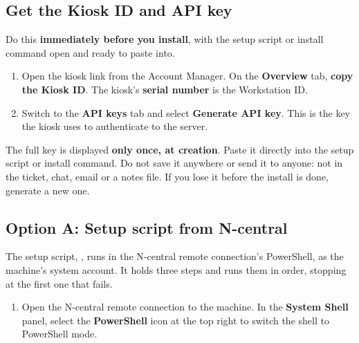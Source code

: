 \documentclass[a4paper,10pt]{article}
\begin{document}
\subsection{Get the Kiosk ID and API key}\label{sec:getkeys}

Do this \textbf{immediately before you install}, with the setup script or
install command open and ready to paste into.

\begin{enumerate}
  \item Open the kiosk link from the Account Manager. On the
        \textbf{Overview} tab, \textbf{copy the Kiosk ID}. The kiosk's
        \textbf{serial number} is the Workstation ID.
\end{enumerate}


\begin{enumerate}\setcounter{enumi}{1}
  \item Switch to the \textbf{API keys} tab and select \textbf{Generate
        API key}. This is the key the kiosk uses to authenticate to the
        server.
\end{enumerate}


\begin{wkwarn}
The full key is displayed \textbf{only once, at creation}. Paste it
directly into the setup script or install command. Do not save it anywhere
or send it to anyone: not in the ticket, chat, email or a notes file. If
you lose it before the install is done, generate a new one.
\end{wkwarn}

\subsection{Option A: Setup script from N-central}\label{sec:ncentral}

The setup script, , runs in the N-central remote
connection's PowerShell, as the machine's system account. It holds three
steps and runs them in order, stopping at the first one that fails.

\begin{enumerate}
  \item Open the N-central remote connection to the machine. In the
        \textbf{System Shell} panel, select the \textbf{PowerShell} icon at
        the top right to switch the shell to PowerShell mode.
\end{enumerate}
\end{document}
